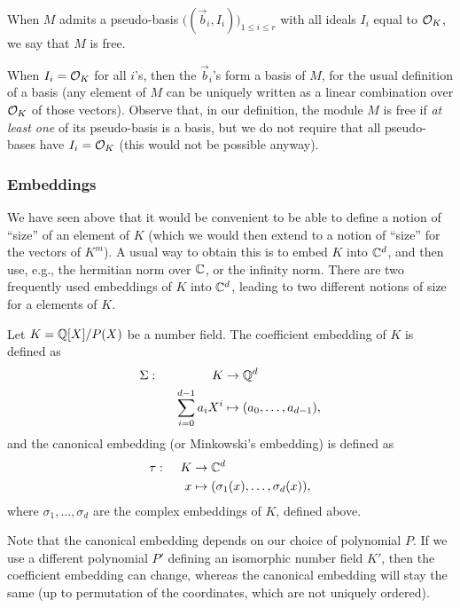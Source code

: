 \begin{definition}
When $M$ admits a pseudo-basis $\big((\vec b_i, I_i)\big)_{1 \leq i \leq r}$ with all ideals $I_i$ equal to $\mathcal{O}_K$, we say that $M$ is free.
\end{definition}
When $I_i = \mathcal{O}_K$ for all $i$'s, then the $\vec b_i$'s form a basis of $M$, for the usual definition of a basis (any element of $M$ can be uniquely written as a linear combination over $\mathcal{O}_K$ of those vectors). Observe that, in our definition, the module $M$ is free if \emph{at least one} of its pseudo-basis is a basis, but we do not require that all pseudo-bases have $I_i = \mathcal{O}_K$ (this would not be possible anyway).

\subsubsection{Embeddings}
\label{sec:embeddings}
We have seen above that it would be convenient to be able to define a notion of ``size'' of an element of $K$ (which we would then extend to a notion of ``size'' for the vectors of $K^m$). A usual way to obtain this is to embed $K$ into $\mathbb{C}^d$, and then use, e.g., the hermitian norm over $\mathbb{C}$, or the infinity norm. There are two frequently used embeddings of $K$ into $\mathbb{C}^d$, leading to two different notions of size for a elements of $K$.

\begin{definition}
Let $K = \mathbb{Q}[X]/P(X)$ be a number field. The coefficient embedding of $K$ is defined as
\begin{align*}
\coeff: \hspace{15mm} K & \rightarrow \QQ^d \\
\sum_{i=0}^{d-1} a_i X^i &\mapsto	(a_0, \dots, a_{d-1}),
\end{align*}
and the canonical embedding (or Minkowski's embedding) is defined as
\begin{align*}
\tau: \hspace{4mm} K & \rightarrow \mathbb{C}^d \\
x &\mapsto	(\sigma_1(x), \dots, \sigma_d(x)),
\end{align*}
where $\sigma_1, \dots, \sigma_d$ are the complex embeddings of $K$, defined above.
\end{definition}

Note that the canonical embedding depends on our choice of polynomial $P$. If we use a different polynomial $P'$ defining an isomorphic number field $K'$, then the coefficient embedding can change, whereas the canonical embedding will stay the same (up to permutation of the coordinates, which are not uniquely ordered).

